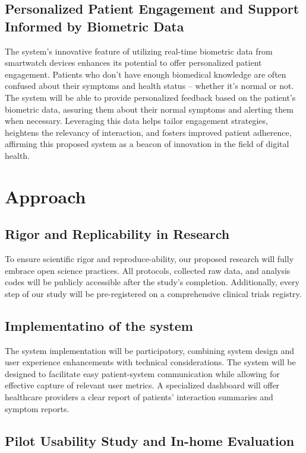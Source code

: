 \documentclass[11pt]{article}
\begin{document}
\subsection{Personalized Patient Engagement and Support Informed by Biometric Data}

The system's innovative feature of utilizing real-time biometric data from smartwatch devices enhances its potential to offer personalized patient engagement. Patients who don't have enough biomedical knowledge are often confused about their symptoms and health status -- whether it's normal or not. The system will be able to provide personalized feedback based on the patient's biometric data, assuring them about their normal symptoms and alerting them when necessary.
Leveraging this data helps tailor engagement strategies, heightens the relevancy of interaction, and fosters improved patient adherence, affirming this proposed system as a beacon of innovation in the field of digital health.

\section{Approach}

\subsection{Rigor and Replicability in Research}

To ensure scientific rigor and reproduce-ability, our proposed research will fully embrace open science practices. All protocols, collected raw data, and analysis codes will be publicly accessible after the study's completion. Additionally, every step of our study will be pre-registered on a comprehensive clinical trials registry.

\subsection{Implementatino of the system}

The system implementation will be participatory, combining system design and user experience enhancements with technical considerations. The system will be designed to facilitate easy patient-system communication while allowing for effective capture of relevant user metrics. A specialized dashboard will offer healthcare providers a clear report of patients' interaction summaries and symptom reports.

\subsection{Pilot Usability Study and In-home Evaluation}
\end{document}
